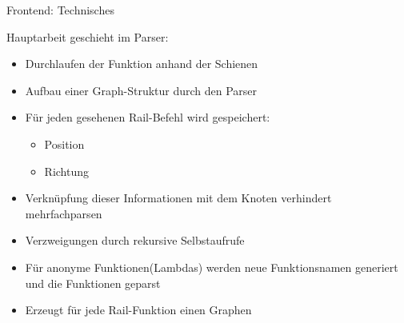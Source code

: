 \begin{frame}{Frontend: Technisches}

Hauptarbeit geschieht im Parser:
\pause
\begin{itemize}
	\item Durchlaufen der Funktion anhand der Schienen
	\pause
	\item Aufbau einer Graph-Struktur durch den Parser
	\pause
	\item F\"ur jeden gesehenen Rail-Befehl wird gespeichert:
	\pause
	\begin{itemize}
		\item Position
		\pause
		\item Richtung
		\pause
	\end{itemize}
	\item Verkn\"upfung dieser Informationen mit dem Knoten verhindert mehrfachparsen
	\pause
	\item Verzweigungen durch rekursive Selbstaufrufe
	\pause
	\item F\"ur anonyme Funktionen(Lambdas) werden neue Funktionsnamen generiert und die Funktionen geparst
	\pause
	\item Erzeugt f\"ur jede Rail-Funktion einen Graphen
\end{itemize}

\end{frame}
